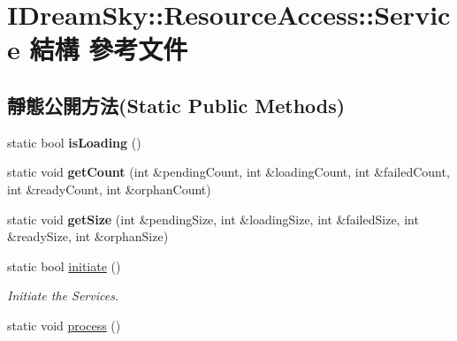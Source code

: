 \hypertarget{struct_i_dream_sky_1_1_resource_access_1_1_service}{}\section{I\+Dream\+Sky\+:\+:Resource\+Access\+:\+:Service 結構 參考文件}
\label{struct_i_dream_sky_1_1_resource_access_1_1_service}
\subsection*{靜態公開方法(Static Public Methods)}
\begin{DoxyCompactItemize}
\item 
static bool {\bfseries is\+Loading} ()\hypertarget{struct_i_dream_sky_1_1_resource_access_1_1_service_aa893341be664102caa787bc7d4ca9abe}{}\label{struct_i_dream_sky_1_1_resource_access_1_1_service_aa893341be664102caa787bc7d4ca9abe}

\item 
static void {\bfseries get\+Count} (int \&pending\+Count, int \&loading\+Count, int \&failed\+Count, int \&ready\+Count, int \&orphan\+Count)\hypertarget{struct_i_dream_sky_1_1_resource_access_1_1_service_ab1a8c5048ce37c67dd88bdf0fc5001b2}{}\label{struct_i_dream_sky_1_1_resource_access_1_1_service_ab1a8c5048ce37c67dd88bdf0fc5001b2}

\item 
static void {\bfseries get\+Size} (int \&pending\+Size, int \&loading\+Size, int \&failed\+Size, int \&ready\+Size, int \&orphan\+Size)\hypertarget{struct_i_dream_sky_1_1_resource_access_1_1_service_a060b0eeff2fa293bdbd48b673e6e5edb}{}\label{struct_i_dream_sky_1_1_resource_access_1_1_service_a060b0eeff2fa293bdbd48b673e6e5edb}

\item 
static bool \hyperlink{struct_i_dream_sky_1_1_resource_access_1_1_service_a9362ec91113c48e4d533109aaf3d62cc}{initiate} ()
\begin{DoxyCompactList}\small\item\em Initiate the Services. \end{DoxyCompactList}\item 
static void \hyperlink{struct_i_dream_sky_1_1_resource_access_1_1_service_a19f4264ebeadf64afe20dd059d719cd3}{process} ()\hypertarget{struct_i_dream_sky_1_1_resource_access_1_1_service_a19f4264ebeadf64afe20dd059d719cd3}{}\label{struct_i_dream_sky_1_1_resource_access_1_1_service_a19f4264ebeadf64afe20dd059d719cd3}


\end{DoxyCompactItemize}
